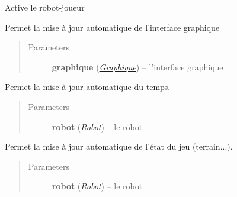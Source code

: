 \documentclass[letterpaper,10pt,english]{sphinxmanual}
\begin{document}

\begin{fulllineitems}
\label{index:lolipooo.play_pooo}
Active le robot-joueur

\end{fulllineitems}


\begin{fulllineitems}
\label{index:lolipooo.updateGraphique}
Permet la mise à jour automatique de l'interface graphique
\begin{quote}\begin{description}
\item[{Parameters}] \leavevmode
\textbf{graphique} ({\hyperref[index:module-Graphique]{\emph{Graphique}}}) -- l'interface graphique

\end{description}\end{quote}

\end{fulllineitems}


\begin{fulllineitems}
\label{index:lolipooo.updateTime}
Permet la mise à jour automatique du temps.
\begin{quote}\begin{description}
\item[{Parameters}] \leavevmode
\textbf{robot} ({\hyperref[index:module-Robot]{\emph{Robot}}}) -- le robot

\end{description}\end{quote}

\end{fulllineitems}


\begin{fulllineitems}
\label{index:lolipooo.updateGame}
Permet la mise à jour automatique de l'état du jeu (terrain...).
\begin{quote}\begin{description}
\item[{Parameters}] \leavevmode
\textbf{robot} ({\hyperref[index:module-Robot]{\emph{Robot}}}) -- le robot

\end{description}\end{quote}

\end{fulllineitems}
\end{document}
